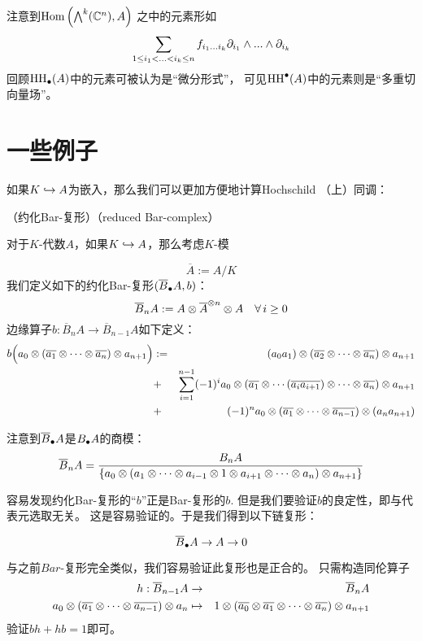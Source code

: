 注意到$\operatorname{Hom}\left(\bigwedge\nolimits^{k}(\mathbb{C}^n),A\right)$
之中的元素形如
$$
\sum_{1\leq i_1<...<i_k\leq n}
f_{i_1...i_k}\partial_{i_1}\wedge...\wedge\partial_{i_k}
$$
回顾$\operatorname{HH}_{\bullet}(A)$中的元素可被认为是“微分形式”，
可见$\operatorname{HH}^{\bullet}(A)$中的元素则是“多重切向量场”。




\section{一些例子}

如果$K\hookrightarrow A$为嵌入，那么我们可以更加方便地计算Hochschild
（上）同调：

\begin{definition}（约化Bar-复形）（reduced Bar-complex）
\label{约化Bar复形-def}

对于$K$-代数$A$，如果$K\hookrightarrow A$，那么考虑$K$-模

$$\overline{A}:=A/K$$
我们定义如下的约化Bar-复形$(\overline{B}_{\bullet} A,b)$：
$$\overline{B}_n A:=A\otimes \overline{A}^{\otimes n}\otimes A
\quad \forall \,i\geq 0$$
边缘算子$b:\overline{B}_n A\to \overline{B}_{n-1} A$如下定义：
\begin{eqnarray*}
b\Big(a_0\otimes(\overline{a_1}\otimes\cdots\otimes \overline{a_n})\otimes a_{n+1}\Big)
&:=&
 (a_0a_1)\otimes(\overline{a_2}\otimes\cdots\otimes\overline{a_n})\otimes a_{n+1}\\
&+ &
 \sum_{i=1}^{n-1}(-1)^ia_0\otimes
    (\overline{a_1}\otimes\cdots
    (\overline{a_ia_{i+1}})\otimes\cdots\otimes \overline{a_n})
    \otimes a_{n+1}\\
&+ &(-1)^n
 a_0\otimes(\overline{a_1}\otimes\cdots\otimes \overline{a_{n-1}})
   \otimes(a_na_{n+1})
\end{eqnarray*}
\end{definition}

注意到$\overline{B}_{\bullet} A$是$B_{\bullet} A$的商模：
$$\overline{B}_nA=
     \frac{B_n A}
     {\{a_0\otimes(a_1\otimes\cdots
     \otimes a_{i-1}\otimes 1\otimes a_{i+1}
     \otimes\cdots\otimes a_n)\otimes a_{n+1}\}
     }
$$

容易发现约化Bar-复形的“$b$”正是Bar-复形的$b$.
但是我们要验证$b$的良定性，即与代表元选取无关。
这是容易验证的。于是我们得到以下链复形：

$$\overline{B}_{\bullet} A\to A\to 0$$

与之前$Bar$-复形完全类似，我们容易验证此复形也是正合的。
只需构造同伦算子
\begin{eqnarray*}
h:\overline{B}_{n-1}A&\to&\overline{B}_{n}A\\
a_0\otimes(\overline{a_1}\otimes\cdots\otimes \overline{a_{n-1}})\otimes a_{n}
&\mapsto&
1\otimes(\overline{a_0}\otimes\overline{a_1}\otimes\cdots\otimes \overline{a_n})\otimes a_{n+1}
\end{eqnarray*}
验证$bh+hb=1$即可。

